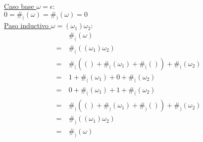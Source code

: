 \documentclass[dcc]{fcfmcourse}
\begin{document}
\begin{problems}
\underline{Caso base $\omega = \epsilon$}: \\
$0=\#_{(}(\omega) = \#_{)}(\omega)=0$\\

\underline{Paso inductivo $\omega = (\omega_{1})\omega_{2}$}:\\ 
\begin{align*}
& \#_{(}(\omega)\\
=\ & \#_{(}((\omega_{1})\omega_{2})\\
=\ & \#_{(}(() + \#_{(}(\omega_{1}) + \#_{(}()) + \#_{(}(\omega_{2})\\
=\ & 1 + \#_{(}(\omega_{1}) + 0 + \#_{(}(\omega_{2})\\
=\ & 0 + \#_{(}(\omega_{1}) + 1 + \#_{(}(\omega_{2})\\
=\ & \#_{)}(() + \#_{)}(\omega_{1}) + \#_{)}()) + \#_{)}(\omega_{2})\\
=\ & \#_{)}((\omega_{1})\omega_{2})\\
=\ &\#_{)}(\omega)
\end{align*}
\end{problems}
\end{document}
